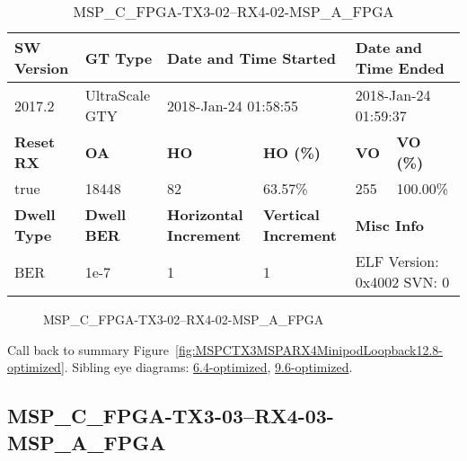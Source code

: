 \begin{table}[h]
\centering
\caption{MSP\_C\_FPGA-TX3-02--RX4-02-MSP\_A\_FPGA}
\label{tab:MSPCFPGATX302RX402MSPAFPGA12.8-optimized}
\begin{tabular}{@{}|l|l|l|l|l|l|@{}}
\toprule
\textbf{SW Version}                & \textbf{GT Type}   & \multicolumn{2}{l|}{\textbf{Date and Time Started}}            & \multicolumn{2}{l|}{\textbf{Date and Time Ended}}        \\ \midrule
2017.2                       & UltraScale GTY          & \multicolumn{2}{l|}{2018-Jan-24 01:58:55}                   & \multicolumn{2}{l|}{2018-Jan-24 01:59:37}               \\ \midrule
\textbf{Reset RX}                  & \textbf{OA} & \textbf{HO}   & \textbf{HO (\%)} & \textbf{VO} & \textbf{VO (\%)} \\ \midrule
true & 18448        & 82          & 63.57\%        & 255        & 100.00\%       \\ \midrule
\textbf{Dwell Type}                & \textbf{Dwell BER} & \textbf{Horizontal Increment} & \textbf{Vertical Increment}    & \multicolumn{2}{l|}{\textbf{Misc Info}}                  \\ \midrule
BER                            & 1e-7        & 1        & 1           & \multicolumn{2}{l|}{ELF Version: 0x4002 SVN: 0}                         \\ \bottomrule
\end{tabular}
\end{table}

\begin{figure}[h]
\caption{MSP\_C\_FPGA-TX3-02--RX4-02-MSP\_A\_FPGA} \label{fig:MSPCFPGATX302RX402MSPAFPGA12.8-optimized}
\end{figure}

Call back to summary Figure~\ref{fig:MSPCTX3MSPARX4MinipodLoopback12.8-optimized}.
Sibling eye diagrams: \hyperref[sec:MSPCFPGATX302RX402MSPAFPGA6.4-optimized]{6.4-optimized}, \hyperref[sec:MSPCFPGATX302RX402MSPAFPGA9.6-optimized]{9.6-optimized}.

\clearpage
\newpage


\subsection{MSP\_C\_FPGA-TX3-03--RX4-03-MSP\_A\_FPGA}\label{sec:MSPCFPGATX303RX403MSPAFPGA12.8-optimized}

